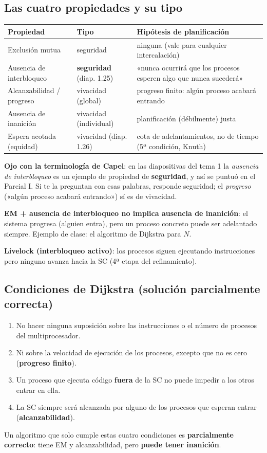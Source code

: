 \documentclass[11pt,a4paper,oneside]{report}
\begin{document}
\subsection{Las cuatro propiedades y su tipo}
\begin{center}\small
\begin{tabular}{p{5cm}p{3.4cm}p{6cm}}
\toprule
\textbf{Propiedad} & \textbf{Tipo} & \textbf{Hipótesis de planificación} \\ \midrule
Exclusión mutua & seguridad & ninguna (vale para cualquier intercalación) \\
Ausencia de interbloqueo & \textbf{seguridad} (diap. 1.25) & «nunca ocurrirá que los procesos esperen algo que nunca sucederá» \\
Alcanzabilidad / progreso & vivacidad (global) & progreso finito: algún proceso acabará entrando \\
Ausencia de inanición & vivacidad (individual) & planificación (débilmente) justa \\
Espera acotada (equidad) & vivacidad (diap. 1.26) & cota de adelantamientos, no de tiempo (5ª condición, Knuth) \\
\bottomrule
\end{tabular}
\end{center}
\textbf{Ojo con la terminología de Capel}: en las diapositivas del tema 1 la \emph{ausencia de interbloqueo} es un
ejemplo de propiedad de \textbf{seguridad}, y así se puntuó en el Parcial I. Si te la preguntan con esas palabras,
responde seguridad; el \emph{progreso} («algún proceso acabará entrando») sí es de vivacidad.

\textbf{EM + ausencia de interbloqueo no implica ausencia de inanición}: el sistema progresa (alguien entra),
pero un proceso concreto puede ser adelantado siempre. Ejemplo de clase: el algoritmo de Dijkstra para $N$.

\textbf{Livelock (interbloqueo activo)}: los procesos siguen ejecutando instrucciones pero ninguno avanza hacia
la SC (4ª etapa del refinamiento).

\subsection{Condiciones de Dijkstra (solución parcialmente correcta)}
\begin{enumerate}[leftmargin=*]
  \item No hacer ninguna suposición sobre las instrucciones o el número de procesos del multiprocesador.
  \item Ni sobre la velocidad de ejecución de los procesos, excepto que no es cero (\textbf{progreso finito}).
  \item Un proceso que ejecuta código \textbf{fuera} de la SC no puede impedir a los otros entrar en ella.
  \item La SC siempre será alcanzada por alguno de los procesos que esperan entrar (\textbf{alcanzabilidad}).
\end{enumerate}
Un algoritmo que solo cumple estas cuatro condiciones es \textbf{parcialmente correcto}: tiene EM y
alcanzabilidad, pero \textbf{puede tener inanición}.
\end{document}
